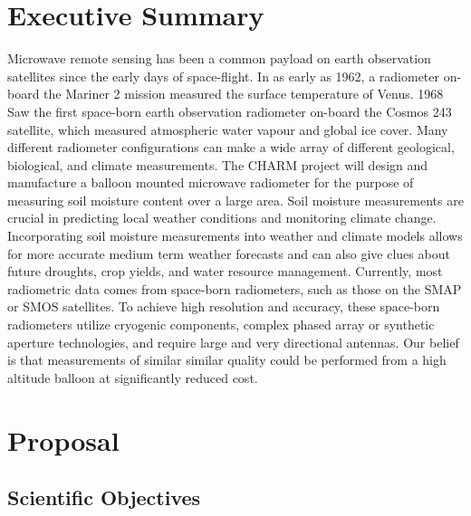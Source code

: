 \documentclass[12pt]{article}
\begin{document}
\listoftables
\newpage

\sectionfont{\scshape}


\section{Executive Summary}
Microwave remote sensing has been a common payload on earth observation satellites since the early days of space-flight. In as early as 1962, a radiometer on-board the Mariner 2 mission measured the surface temperature of Venus. 1968 Saw the first space-born earth observation radiometer on-board the  Cosmos 243 satellite, which measured atmospheric water vapour and global ice cover. Many different radiometer configurations can make a wide array of different geological, biological, and climate measurements. The CHARM project will design and manufacture a balloon mounted microwave radiometer for the purpose of measuring soil moisture content over a large area. Soil moisture measurements are crucial in predicting local weather conditions and monitoring climate change. Incorporating soil moisture measurements into weather and climate models allows for more accurate medium term weather forecasts and can also give clues about future droughts, crop yields, and water resource management. Currently, most radiometric data comes from space-born radiometers, such as those on the SMAP or SMOS satellites. To achieve high resolution and accuracy, these space-born radiometers utilize cryogenic components, complex phased array or synthetic aperture technologies, and require large and very directional antennas. Our belief is that measurements of similar similar quality could be performed from a high altitude balloon at significantly reduced cost. 

\newpage

\section{Proposal}
\subsection{Scientific Objectives}
\end{document}
